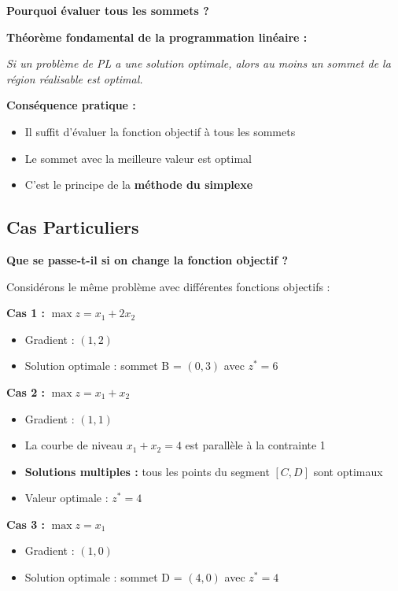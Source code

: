 \documentclass[12pt,a4paper]{article}
\begin{document}
\begin{remarque}
\textbf{Pourquoi évaluer tous les sommets ?}

\textbf{Théorème fondamental de la programmation linéaire :}

\textit{Si un problème de PL a une solution optimale, alors au moins un sommet de la région réalisable est optimal.}

\textbf{Conséquence pratique :}
\begin{itemize}
    \item Il suffit d'évaluer la fonction objectif à tous les sommets
    \item Le sommet avec la meilleure valeur est optimal
    \item C'est le principe de la \textcolor{algoviolet}{\textbf{méthode du simplexe}}
\end{itemize}
\end{remarque}

\newpage
\subsection{Cas Particuliers}

\begin{remarque}
\textbf{Que se passe-t-il si on change la fonction objectif ?}

Considérons le même problème avec différentes fonctions objectifs :

\textbf{Cas 1 :} $\max z = x_1 + 2x_2$
\begin{itemize}
    \item Gradient : $(1, 2)$
    \item Solution optimale : sommet B = $(0, 3)$ avec $z^* = 6$
\end{itemize}

\textbf{Cas 2 :} $\max z = x_1 + x_2$
\begin{itemize}
    \item Gradient : $(1, 1)$
    \item La courbe de niveau $x_1 + x_2 = 4$ est parallèle à la contrainte 1
    \item \textcolor{importantrouge}{\textbf{Solutions multiples :}} tous les points du segment $[C, D]$ sont optimaux
    \item Valeur optimale : $z^* = 4$
\end{itemize}

\textbf{Cas 3 :} $\max z = x_1$
\begin{itemize}
    \item Gradient : $(1, 0)$
    \item Solution optimale : sommet D = $(4, 0)$ avec $z^* = 4$
\end{itemize}
\end{remarque}
\end{document}
